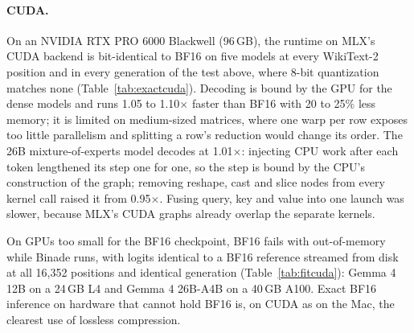 \documentclass[11pt]{article}
\newcommand{\x}{$\times$}
\begin{document}
\paragraph{CUDA.} On an NVIDIA RTX PRO 6000 Blackwell (96\,GB), the runtime on MLX's CUDA backend is bit-identical to BF16 on five models at every WikiText-2 position and in every generation of the test above, where 8-bit quantization matches none (Table~\ref{tab:exactcuda}). Decoding is bound by the GPU for the dense models and runs 1.05 to 1.10\x{} faster than BF16 with 20 to 25\% less memory; it is limited on medium-sized matrices, where one warp per row exposes too little parallelism and splitting a row's reduction would change its order. The 26B mixture-of-experts model decodes at 1.01\x{}: injecting CPU work after each token lengthened its step one for one, so the step is bound by the CPU's construction of the graph; removing reshape, cast and slice nodes from every kernel call raised it from 0.95\x{}. Fusing query, key and value into one launch was slower, because MLX's CUDA graphs already overlap the separate kernels.

\begin{table}[t]
\centering
\caption{CUDA (RTX PRO 6000): exactness against resident BF16 (test of Table~\ref{tab:exact}), 8-bit for reference, decoding speed and peak memory.}
\label{tab:exactcuda}
\resizebox{\linewidth}{!}{}
\end{table}

On GPUs too small for the BF16 checkpoint, BF16 fails with out-of-memory while Binade runs, with logits identical to a BF16 reference streamed from disk at all 16,352 positions and identical generation (Table~\ref{tab:fitcuda}): Gemma 4 12B on a 24\,GB L4 and Gemma 4 26B-A4B on a 40\,GB A100. Exact BF16 inference on hardware that cannot hold BF16 is, on CUDA as on the Mac, the clearest use of lossless compression.

\begin{table}[t]
\centering
\caption{Smaller NVIDIA GPUs: BF16 does not load; Binade against BF16 decoder layers streamed from disk (32 windows of 512 tokens).}
\label{tab:fitcuda}
\resizebox{\linewidth}{!}{}
\end{table}
\end{document}

